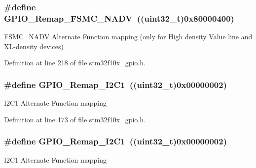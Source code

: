 \subsubsection[{\texorpdfstring{G\+P\+I\+O\+\_\+\+Remap\+\_\+\+F\+S\+M\+C\+\_\+\+N\+A\+DV}{GPIO_Remap_FSMC_NADV}}]{\setlength{\rightskip}{0pt plus 5cm}\#define G\+P\+I\+O\+\_\+\+Remap\+\_\+\+F\+S\+M\+C\+\_\+\+N\+A\+DV~(({\bf uint32\+\_\+t})0x80000400)}\hypertarget{group___g_p_i_o___remap__define_ga97088efda8b8a057f4ba58de8f51625f}{}\label{group___g_p_i_o___remap__define_ga97088efda8b8a057f4ba58de8f51625f}
F\+S\+M\+C\+\_\+\+N\+A\+DV Alternate Function mapping (only for High density Value line and X\+L-\/density devices) 

Definition at line 218 of file stm32f10x\+\_\+gpio.\+h.

\subsubsection[{\texorpdfstring{G\+P\+I\+O\+\_\+\+Remap\+\_\+\+I2\+C1}{GPIO_Remap_I2C1}}]{\setlength{\rightskip}{0pt plus 5cm}\#define G\+P\+I\+O\+\_\+\+Remap\+\_\+\+I2\+C1~(({\bf uint32\+\_\+t})0x00000002)}\hypertarget{group___g_p_i_o___remap__define_ga6cf601e6db62cb2e9dbbccb276401b18}{}\label{group___g_p_i_o___remap__define_ga6cf601e6db62cb2e9dbbccb276401b18}
I2\+C1 Alternate Function mapping 

Definition at line 173 of file stm32f10x\+\_\+gpio.\+h.

\subsubsection[{\texorpdfstring{G\+P\+I\+O\+\_\+\+Remap\+\_\+\+I2\+C1}{GPIO_Remap_I2C1}}]{\setlength{\rightskip}{0pt plus 5cm}\#define G\+P\+I\+O\+\_\+\+Remap\+\_\+\+I2\+C1~(({\bf uint32\+\_\+t})0x00000002)}\hypertarget{group___g_p_i_o___remap__define_ga6cf601e6db62cb2e9dbbccb276401b18}{}\label{group___g_p_i_o___remap__define_ga6cf601e6db62cb2e9dbbccb276401b18}
I2\+C1 Alternate Function mapping 

